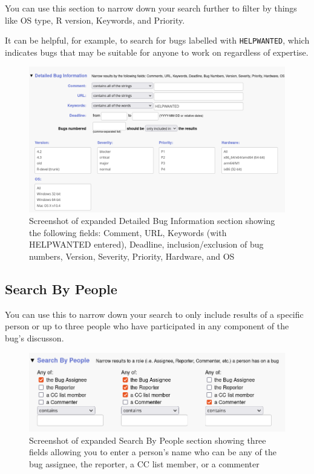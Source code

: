 \documentclass[
]{book}
\begin{document}
You can use this section to narrow down your search further to filter by things like OS type, R version, Keywords, and Priority.

It can be helpful, for example, to search for bugs labelled with \texttt{HELPWANTED}, which indicates bugs that may be suitable for anyone to work on regardless of expertise.

\begin{figure}
\centering
\includegraphics{img/bugzilla-adv-search-detailed-bug-info.png}
\caption{Screenshot of expanded Detailed Bug Information section showing the following fields: Comment, URL, Keywords (with HELPWANTED entered), Deadline, inclusion/exclusion of bug numbers, Version, Severity, Priority, Hardware, and OS}
\end{figure}

\subsection{Search By People}\label{searching-sbp}

You can use this to narrow down your search to only include results of a specific person or up to three people who have participated in any component of the bug's discusson.

\begin{figure}
\centering
\includegraphics{img/bugzilla-adv-search-search-by-people.png}
\caption{Screenshot of expanded Search By People section showing three fields allowing you to enter a person's name who can be any of the bug assignee, the reporter, a CC list member, or a commenter}
\end{figure}
\end{document}
